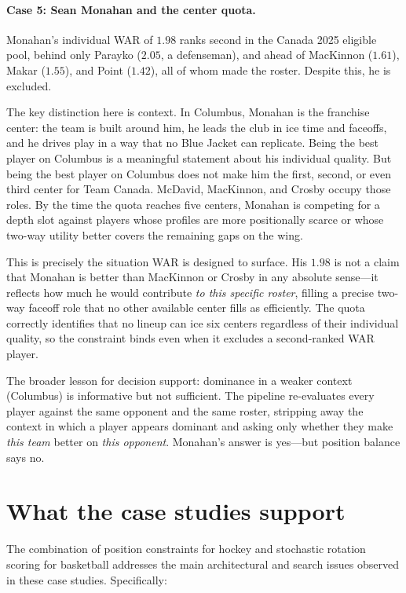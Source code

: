 \documentclass[11pt,letterpaper]{article}
\begin{document}
\paragraph{Case 5: Sean Monahan and the center quota.}
Monahan's individual WAR of $1.98$ ranks second in the Canada 2025
eligible pool, behind only Parayko ($2.05$, a defenseman), and ahead
of MacKinnon ($1.61$), Makar ($1.55$), and Point ($1.42$), all of
whom made the roster. Despite this, he is excluded.

The key distinction here is context. In Columbus, Monahan is the
franchise center: the team is built around him, he leads the club in
ice time and faceoffs, and he drives play in a way that no Blue Jacket
can replicate. Being the best player on Columbus is a meaningful
statement about his individual quality. But being the best player on
Columbus does not make him the first, second, or even third center for
Team Canada. McDavid, MacKinnon, and Crosby occupy those roles. By the
time the quota reaches five centers, Monahan is competing for a depth
slot against players whose profiles are more positionally scarce or
whose two-way utility better covers the remaining gaps on the wing.

This is precisely the situation WAR is designed to surface. His $1.98$
is not a claim that Monahan is better than MacKinnon or Crosby in any
absolute sense---it reflects how much he would contribute
\emph{to this specific roster}, filling a precise two-way faceoff role
that no other available center fills as efficiently. The quota correctly
identifies that no lineup can ice six centers regardless of their
individual quality, so the constraint binds even when it excludes a
second-ranked WAR player.

The broader lesson for decision support: dominance in a weaker context
(Columbus) is informative but not sufficient. The pipeline re-evaluates
every player against the same opponent and the same roster, stripping
away the context in which a player appears dominant and asking only
whether they make \emph{this team} better on \emph{this opponent}.
Monahan's answer is yes---but position balance says no.

\section{What the case studies support}

The combination of position constraints for hockey and stochastic
rotation scoring for basketball addresses the main architectural and
search issues observed in these case studies. Specifically:
\end{document}
